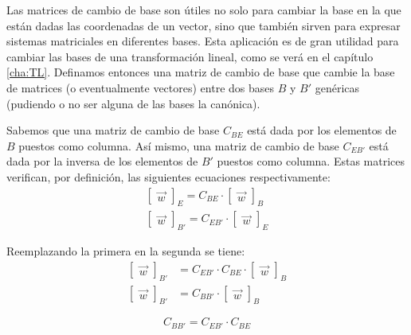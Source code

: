 Las  matrices de cambio de base son útiles no solo para cambiar la base en la que están dadas las coordenadas de un vector, sino que también sirven para expresar sistemas matriciales en diferentes bases.
Esta aplicación es de gran utilidad para cambiar las bases de una transformación lineal, como se verá en el capítulo \ref{cha:TL}.
Definamos entonces una matriz de cambio de base que cambie la base de matrices (o eventualmente vectores) entre dos bases $B$ y $B'$ genéricas (pudiendo o no ser alguna de las bases la canónica).

Sabemos que una matriz de cambio de base $C_{BE}$ está dada por los elementos de $B$ puestos como columna.
Así mismo, una matriz de cambio de base $C_{EB'}$ está dada por la inversa de los elementos de $B'$ puestos como columna.
Estas matrices verifican, por definición, las siguientes ecuaciones respectivamente:
\begin{gather*}
    \begin{bmatrix}
        \Vec{w}
    \end{bmatrix}_E
    = C_{BE} \cdot
    \begin{bmatrix}
        \Vec{w}
    \end{bmatrix}_B
    \\[1ex]
    \begin{bmatrix}
        \Vec{w}
    \end{bmatrix}_{B'}
    = C_{EB'} \cdot
    \begin{bmatrix}
        \Vec{w}
    \end{bmatrix}_E
\end{gather*}

Reemplazando la primera en la segunda se tiene:
\begin{align*}
    \begin{bmatrix}
        \Vec{w}
    \end{bmatrix}_{B'}
    &= C_{EB'} \cdot C_{BE} \cdot
    \begin{bmatrix}
        \Vec{w}
    \end{bmatrix}_B
    \\[1ex]
    \begin{bmatrix}
        \Vec{w}
    \end{bmatrix}_{B'}
    &= C_{BB'} \cdot
    \begin{bmatrix}
        \Vec{w}
    \end{bmatrix}_B
\end{align*}

\begin{mdframed}[style=DefinitionFrame]
    \begin{defn}
        \label{defn:C_BB'}
    \end{defn}
    \begin{equation*}
        C_{BB'} = C_{EB'} \cdot C_{BE}
    \end{equation*}
\end{mdframed}

